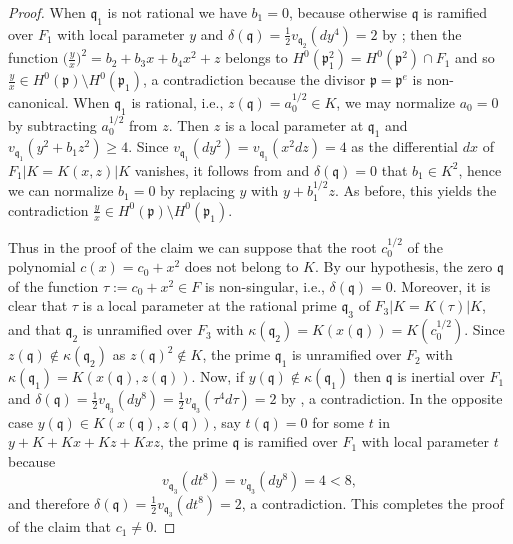 \documentclass[12pt,reqno]{amsart}
\newcommand{\todoo}[2][]{\todo[size=tiny, #1]{#2}} %
\theoremstyle{definition}
\newcommand{\su}{\subset}
\newcommand{\pp}{\mathfrak{p}}
\newcommand{\fq}{\mathfrak{q}}
\newcommand{\de}{\delta}
\newcommand{\ka}{\kappa}
\begin{document}
\begin{proof}
When $\fq_1$ is not rational we have $b_1=0$, because otherwise $\fq$ is ramified over $F_1$ with local parameter $y$ and $\de(\fq)= \frac12 v_{\fq_2}(dy^4)=2$ by \cite[Theorem~2.3]{BedSt87};
then the function $\big( \frac yx \big)^2 = b_2 + b_3 x + b_4 x^2 + z$ belongs to $H^0(\pp_1^2) = H^0(\pp^2) \cap F_1$ and so $\frac {y}{x} \in H^0(\pp)\setminus H^0(\pp_1)$, a contradiction because the divisor $\pp=\pp^e$ is non-canonical.
When $\fq_1$ is rational, i.e., $z(\fq)=a_0^{1/2} \in K$, we may normalize $a_0=0$ by subtracting $a_0^{1/2}$ from $z$. Then $z$ is a local parameter at $\fq_1$ and $v_{\fq_1}(y^2 + b_1 z^2) \geq 4$.
Since $v_{\fq_1}(dy^2) = v_{\fq_1}(x^2 dz)=4$ as the differential $dx$ of $F_1|K=K(x,z)|K$ vanishes, it follows from \cite[Proposition~4.1]{BedSt87} and $\de(\fq)=0$ that $b_1\in K^2$, hence we can normalize $b_1=0$ by replacing $y$ with $y + b_1^{1/2}z$.
As before, this yields the contradiction $\frac yx \in H^0(\pp)\setminus H^0(\pp_1)$.

Thus in the proof of the claim we can suppose that the root
$c_0^{1/2}$ of the polynomial $c(x)=c_0 + x^2$ does not belong to $K$.
By our hypothesis, the zero $\fq$ of the function $\tau:=c_0 + x^2 \in F$ is non-singular, i.e., $\de(\fq)=0$.
Moreover, it is clear that $\tau$ is a local parameter at the rational prime $\fq_3$ of $F_3|K=K(\tau)|K$, and that $\fq_2$ is unramified over $F_3$ with $\ka(\fq_2)=K(x(\fq)) = K(c_0^{1/2})$.
Since $z(\fq)\notin \ka(\fq_2)$ as 
$z(\fq)^2 \notin K$,
the prime $\fq_1$ is unramified over $F_2$ with $\ka(\fq_1) = K(x(\fq),z(\fq))$.
Now, if $y(\fq)\notin \ka(\fq_1)$ then $\fq$ is inertial over $F_1$ and $\de({\fq})=\frac12 v_{\fq_3}(dy^8)=\frac12 v_{\fq_3}(\tau^4 d\tau) = 2$ by \cite[Theorem~2.3]{BedSt87}, a contradiction.
In the opposite case $y(\fq) \in K(x(\fq),z(\fq))$, say $t(\fq)=0$ for some $t$ in $y + K + K x + K z + K xz$, the prime $\fq$ is ramified over $F_1$ with local parameter $t$ because 
\[ v_{\fq_3}(dt^8) = v_{\fq_3}(dy^8) =4<8, \]
and therefore $\de(\fq)=\frac12 v_{\fq_3}(dt^8)=2$, a contradiction.
This completes the proof of the claim that $c_1 \neq 0$.


\end{proof}
\end{document}
